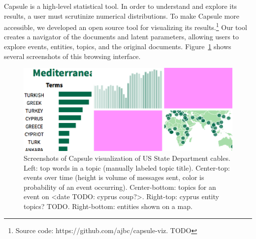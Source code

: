 Capsule is a high-level statistical tool. In order to understand and explore its results, a user must scrutinize numerical distributions.
To make Capsule more accessible, we developed an open source tool for visualizing its results.\footnote{Source code: https://github.com/ajbc/capsule-viz. TODO}  Our tool creates a navigator of the documents and latent parameters, allowing users to explore events, entities, topics, and the original documents.  Figure~\ref{fig:viz} shows several screenshots of this browsing interface.

\begin{figure}
\centering
\includegraphics[width=\linewidth]{fig/viz.png}
\caption{Screenshots of Capsule visualization of US State Department cables.  Left: top words in a topic (manually labeled topic title).  Center-top: events over time (height is volume of messages sent, color is probability of an event occurring).  Center-bottom: topics for an event on <date TODO: cyprus coup?>.  Right-top: cyprus entity topics? TODO.  Right-bottom: entities shown on a map.}
\label{fig:viz}
\end{figure}
